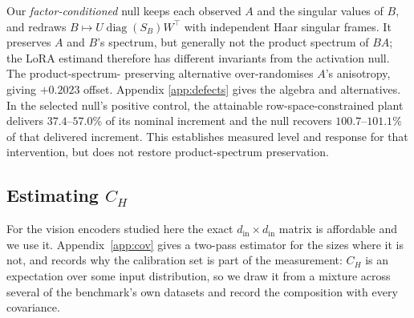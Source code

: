 Our \emph{factor-conditioned} null keeps each observed $A$ and the singular values of $B$, and
redraws $B\mapsto U\operatorname{diag}(S_B)W^\top$ with independent Haar singular frames. It
preserves $A$ and $B$'s spectrum, but generally not the product spectrum of $BA$; the LoRA
estimand therefore has different invariants from the activation null. The product-spectrum-
preserving alternative over-randomises $A$'s anisotropy, giving $+0.2023$ offset. Appendix
\ref{app:defects} gives the algebra and alternatives. In the selected null's positive control,
the attainable row-space-constrained plant delivers $37.4$--$57.0\%$ of its nominal increment
and the null recovers $100.7$--$101.1\%$ of that delivered increment. This establishes measured
level and response for that intervention, but does not restore product-spectrum preservation.

\subsection{Estimating $C_H$}
\label{sec:cov}

For the vision encoders studied here the exact $d_{\mathrm{in}} \times d_{\mathrm{in}}$ matrix is
affordable and we use it. Appendix~\ref{app:cov} gives a two-pass estimator for the sizes where
it is not, and records why the calibration set is part of the measurement: $C_H$ is an
expectation over some input distribution, so we draw it from a mixture across several of the
benchmark's own datasets and record the composition with every covariance.
